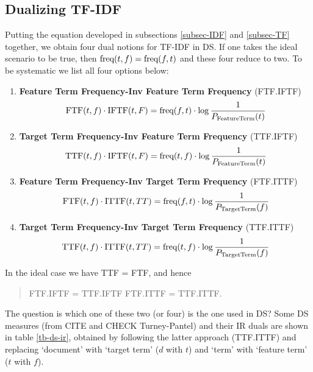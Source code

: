 \subsection{Dualizing TF-IDF}
\label{subsec-TF-IDF}

Putting  the equation developed in subsections \ref{subsec-IDF} and \ref{subsec-TF} together,  we obtain four dual notions  for TF-IDF in DS. If one takes the  ideal scenario to be true, then  $\textmd{freq}(t,f) = \textmd{freq}(f,t)$ and these four reduce to  two.  To be systematic we list all four options below: 

\begin{enumerate}
\item {\bf Feature Term Frequency-Inv Feature Term Frequency} (FTF.IFTF) 
\begin{equation}
\label{ftf-iftf}
\textmd{FTF}(t,f) \cdot \textmd{IFTF}(t, F) =  \textmd{freq}(f, t) \cdot \log{\frac{1}{P_{\textmd{FeatureTerm}}(t)}}
\end{equation}
\item  {\bf Target Term Frequency-Inv Feature Term Frequency} (TTF.IFTF)
\begin{equation}
\label{ttf-iftf}
\textmd{TTF}(t,f) \cdot \textmd{IFTF}(t, F) =  \textmd{freq}(t,f) \cdot \log{\frac{1}{P_{\textmd{FeatureTerm}}(t)}}
\end{equation}
\item {\bf Feature Term Frequency-Inv Target Term Frequency} (FTF.ITTF)
\begin{equation}
\label{ftf-ittf}
\textmd{FTF}(t,f) \cdot \textmd{ITTF}(t, TT) =  \textmd{freq}(f, t) \cdot \log{\frac{1}{P_{\textmd{TargetTerm}}(f)}}
\end{equation}
\item  {\bf Target Term Frequency-Inv Target Term Frequency} (TTF.ITTF)
\begin{equation}
\label{ttf-ittf}
\textmd{TTF}(t,f) \cdot \textmd{ITTF}(t, TT) =  \textmd{freq}(t, f) \cdot \log{\frac{1}{P_{\textmd{TargetTerm}}(f)}}
\end{equation}
\end{enumerate}

In the ideal case we have TTF = FTF, and hence 
\begin{quote}
FTF.IFTF = TTF.IFTF \qquad FTF.ITTF = TTF.ITTF. 
\end{quote}

The question is  which one of these two (or four)  is the one used in DS? Some DS measures (from \cite{BullineriaLevy} CITE and CHECK Turney-Pantel) and their IR duals are shown in table \ref{tb-ds-ir}, obtained by following the latter approach (TTF.ITTF) and  replacing  `document' with `target term'  ($d$ with $t$) and  `term' with `feature term'  ($t$ with $f$).
  

